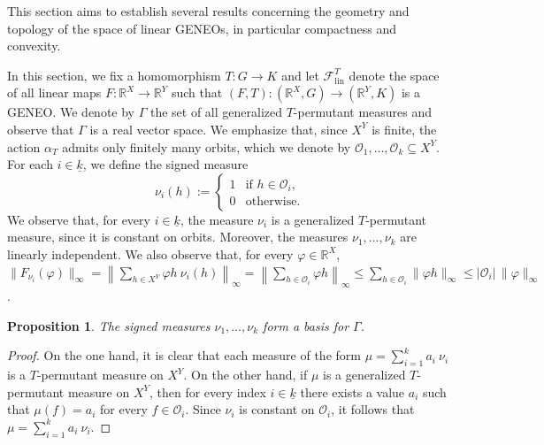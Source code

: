 \documentclass[11pt]{article}
\newcommand{\R}{\mathbb{R}}
\newcommand{\p}{\varphi}
\newtheorem{proposition}[theorem]{Proposition}
\begin{document}
{\color{black} This section aims to establish several results concerning the geometry and
topology of the space of linear GENEOs, in particular compactness and
convexity.

In this section, we fix a homomorphism \(T \colon G \to K\) and let \(\mathcal{F}^T_{\mathrm{lin}}\) denote the space of all linear maps \(F \colon \mathbb{R}^X \to \mathbb{R}^Y\) such that $(F, T) \colon (\R^X, G) \to (\R^Y, K)$ is a GENEO. We denote by \(\Gamma\) the set of all generalized \(T\)-permutant measures and observe that \(\Gamma\) is a real vector space. 
We emphasize that, since $X^Y$ is finite, the action $\alpha_T$
admits only finitely many orbits, which we denote by
$\mathcal{O}_1, \dots, \mathcal{O}_k \subseteq X^Y$.
For each $i \in \underline{k}$, we define the signed measure
\[
\nu_i(h) :=
\begin{cases}
1 & \text{if } h \in \mathcal{O}_i, \\
0 & \text{otherwise}.
\end{cases}
\]
We observe that, for every $i\in \underline{k}$, the measure $\nu_i$ 
is a generalized $T$-permutant measure, since it is constant on
orbits. 
Moreover, the measures $\nu_1,\ldots,\nu_k$ are linearly independent.
We also observe that, for every $\p \in \mathbb{R}^X$,
$\|F_{\nu_i}(\p)\|_\infty
=
\left\|
\sum_{h \in X^Y} \p h \ \nu_i(h)
\right\|_\infty
=
\left\|
\sum_{h \in \mathcal{O}_i} \p h
\right\|_\infty
\le
\sum_{h \in \mathcal{O}_i}
\|\p h\|_\infty
\le
|\mathcal{O}_i|\,\|\p\|_\infty$.


\begin{proposition}
\label{prop:convexity}
The signed measures $\nu_1, \ldots, \nu_k$ form a basis for $\Gamma$.
\end{proposition}

\begin{proof}
On the one hand, it is clear that each measure of the form $\mu=\sum_{i=1}^k a_i \ \nu_i$
is a $T$-permutant measure on $X^Y$.
On the other hand, if $\mu$ is a generalized $T$-permutant measure on $X^Y$, then for every
index $i\in\underline{k}$ there exists a value $a_i$ such that
$\mu(f)=a_i$ for every $f\in\mathcal O_i$.
Since $\nu_i$ is constant on $\mathcal O_i$, it follows that $\mu = \sum_{i=1}^k a_i \ \nu_i$.
\end{proof}

}
\end{document}
